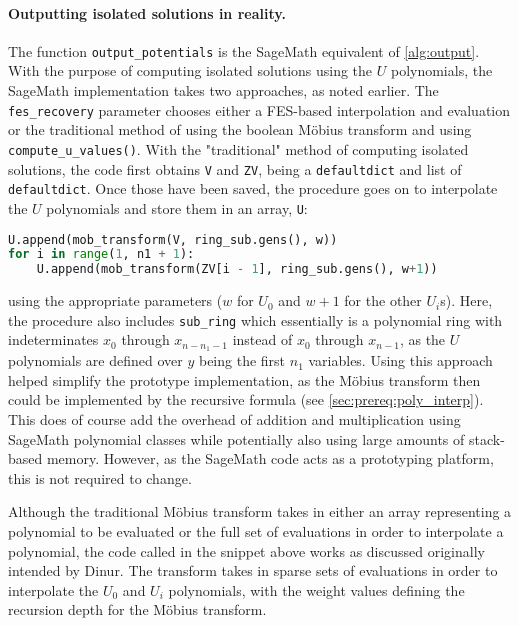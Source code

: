 \paragraph{Outputting isolated solutions in reality.} The function \texttt{output\_potentials} is the SageMath equivalent of \cref{alg:output}. With the purpose of computing isolated solutions using the $U$ polynomials, the SageMath implementation takes two approaches, as noted earlier. The \texttt{fes\_recovery} parameter chooses either a FES-based interpolation and evaluation or the traditional method of using the boolean Möbius transform and using \texttt{compute\_u\_values()}. With the "traditional" method of computing isolated solutions, the code first obtains \texttt{V} and \texttt{ZV}, being a \texttt{defaultdict} and list of \texttt{defaultdict}. Once those have been saved, the procedure goes on to interpolate the $U$ polynomials and store them in an array, \texttt{U}:
\begin{lstlisting}[language=Python,style=mystyle]
U.append(mob_transform(V, ring_sub.gens(), w))
for i in range(1, n1 + 1):
    U.append(mob_transform(ZV[i - 1], ring_sub.gens(), w+1))
\end{lstlisting}
using the appropriate parameters ($w$ for $U_0$ and $w + 1$ for the other $U_i$s). Here, the procedure also includes \texttt{sub\_ring} which essentially is a polynomial ring with indeterminates $x_0$ through $x_{n - n_1 - 1}$ instead of $x_0$ through $x_{n - 1}$, as the $U$ polynomials are defined over $y$ being the first $n_1$ variables. Using this approach helped simplify the prototype implementation, as the Möbius transform then could be implemented by the recursive formula (see \cref{sec:prereq:poly_interp}). This does of course add the overhead of addition and multiplication using SageMath polynomial classes while potentially also using large amounts of stack-based memory. However, as the SageMath code acts as a prototyping platform, this is not required to change.

Although the traditional Möbius transform takes in either an array representing a polynomial to be evaluated or the full set of evaluations in order to interpolate a polynomial, the code called in the snippet above works as discussed originally intended by Dinur. The transform takes in sparse sets of evaluations in order to interpolate the $U_0$ and $U_i$ polynomials, with the weight values defining the recursion depth for the Möbius transform. 

